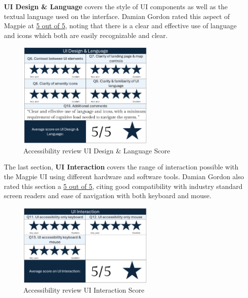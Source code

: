 \newpage{}

\noindent\textbf{UI Design \& Language} covers the style of UI components as
well as the textual language used on the interface. Damian Gordon rated this
aspect of Magpie at \underline{5 out of 5}, noting that there is a clear and
effective use of language and icons which both are easily recognizable and
clear.

\begin{figure}[h!]
    \centering
    \includegraphics[width=0.6\textwidth]{images/accessb-survey-design.png}
    \caption{Accessibility review \- UI Design \& Language Score}
\end{figure}

\noindent The last section, \textbf{UI Interaction} covers the range of
interaction possible with the Magpie UI using different hardware and software
tools. Damian Gordon also rated this section a \underline{5 out of 5}, citing
good compatibility with industry standard screen readers and ease of navigation
with both keyboard and mouse.

\begin{figure}[h!]
    \centering
    \includegraphics[width=0.6\textwidth]{images/accessb-survey-interaction.png}
    \caption{Accessibility review \- UI Interaction Score}
\end{figure}

